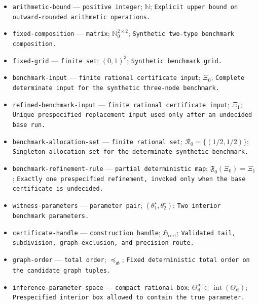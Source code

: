 \documentclass{article}
\begin{document}
\begin{itemize}
  \item \texttt{arithmetic-\allowbreak{}bound} --- \texttt{positive integer}; \(\mathbb N\); \texttt{Explicit upper bound on outward-\allowbreak{}rounded arithmetic operations.}
  \item \texttt{fixed-\allowbreak{}composition} --- \texttt{matrix}; \(\mathbb N_0^{2\times2}\); \texttt{Synthetic two-\allowbreak{}type benchmark composition.}
  \item \texttt{fixed-\allowbreak{}grid} --- \texttt{finite set}; \((0,1)^3\); \texttt{Synthetic benchmark grid.}
  \item \texttt{benchmark-\allowbreak{}input} --- \texttt{finite rational certificate input}; \(\Xi_0\); \texttt{Complete determinate input for the synthetic three-\allowbreak{}node benchmark.}
  \item \texttt{refined-\allowbreak{}benchmark-\allowbreak{}input} --- \texttt{finite rational certificate input}; \(\Xi_1\); \texttt{Unique prespecified replacement input used only after an undecided base run.}
  \item \texttt{benchmark-\allowbreak{}allocation-\allowbreak{}set} --- \texttt{finite rational set}; \(\mathcal R_0=\{(1/2,1/2)\}\); \texttt{Singleton allocation set for the determinate synthetic benchmark.}
  \item \texttt{benchmark-\allowbreak{}refinement-\allowbreak{}rule} --- \texttt{partial deterministic map}; \(\mathfrak F_0(\Xi_0)=\Xi_1\); \texttt{Exactly one prespecified refinement,\allowbreak{} invoked only when the base certificate is undecided.}
  \item \texttt{witness-\allowbreak{}parameters} --- \texttt{parameter pair}; \((\theta_1^\star,\theta_2^\star)\); \texttt{Two interior benchmark parameters.}
  \item \texttt{certificate-\allowbreak{}handle} --- \texttt{construction handle}; \(\mathfrak H_{\mathrm{cert}}\); \texttt{Validated tail,\allowbreak{} subdivision,\allowbreak{} graph-\allowbreak{}exclusion,\allowbreak{} and precision route.}
  \item \texttt{graph-\allowbreak{}order} --- \texttt{total order}; \(\preceq_{\mathfrak G}\); \texttt{Fixed deterministic total order on the candidate graph tuples.}
  \item \texttt{inference-\allowbreak{}parameter-\allowbreak{}space} --- \texttt{compact rational box}; \(\Theta^{\mathrm{in}}_{\boldsymbol d}\subset\operatorname{int}(\Theta_{\boldsymbol d})\); \texttt{Prespecified interior box allowed to contain the true parameter.}

\end{itemize}
\end{document}
